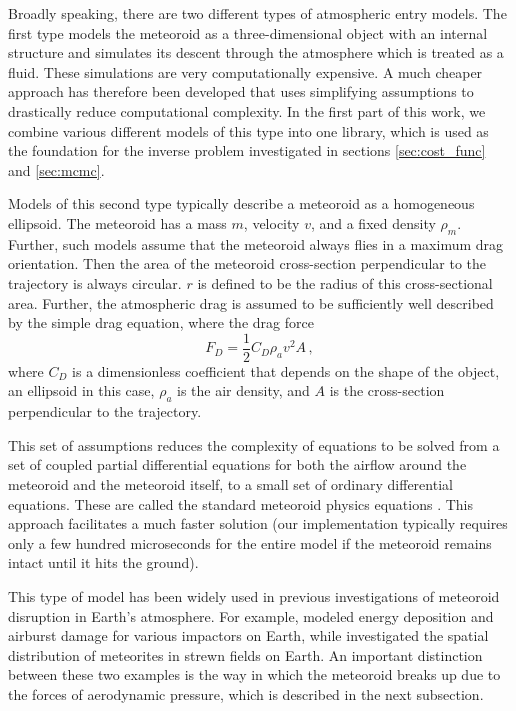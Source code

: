 Broadly speaking, there are two different types of atmospheric entry models.
The first type models the meteoroid as a three-dimensional object with an internal structure and simulates its descent through the atmosphere which is treated as a fluid.
These simulations are very computationally expensive.
A much cheaper approach has therefore been developed that uses simplifying assumptions to drastically reduce computational complexity.
In the first part of this work, we combine various different models of this type into one library, which is used as the foundation for the inverse problem investigated in sections \ref{sec:cost_func} and \ref{sec:mcmc}.

Models of this second type typically describe a meteoroid as a homogeneous ellipsoid. The meteoroid has a mass $m$, velocity $v$, and a fixed density $\rho_m$. Further, such models assume that the meteoroid always flies in a maximum drag orientation. Then the area of the meteoroid cross-section perpendicular to the trajectory is always circular. $r$ is defined to be the radius of this cross-sectional area. Further, the atmospheric drag is assumed to be sufficiently well described by the simple drag equation, where the drag force
\begin{equation*}
    F_D = \frac{1}{2}C_D \rho_a v^2 A\,,
\end{equation*}
where $C_D$ is a dimensionless coefficient that depends on the shape of the object, an ellipsoid in this case, $\rho_a$ is the air density, and $A$ is the cross-section perpendicular to the trajectory.

This set of assumptions reduces the complexity of equations to be solved from a set of coupled partial differential equations for both the airflow around the meteoroid and the meteoroid itself, to a small set of ordinary differential equations.
These are called the standard meteoroid physics equations \citep[e.g.,][]{passey1980effects}.
This approach facilitates a much faster solution (our implementation typically requires only a few hundred microseconds for the entire model if the meteoroid remains intact until it hits the ground).

 This type of model has been widely used in previous investigations of meteoroid disruption in Earth's atmosphere. For example, \cite{hills1993fragmentation} modeled energy deposition and airburst damage for various impactors on Earth, while \cite{passey1980effects} investigated the spatial distribution of meteorites in strewn fields on Earth. An important distinction between these two examples is the way in which the meteoroid breaks up due to the forces of aerodynamic pressure, which is described in the next subsection. 

